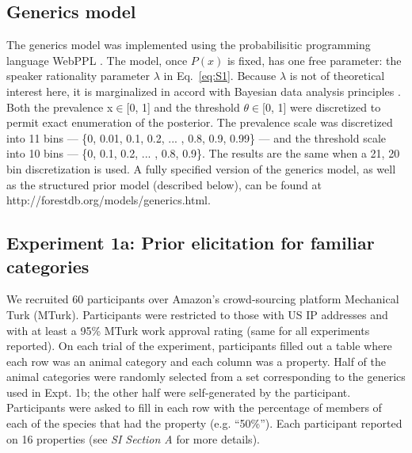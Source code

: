 \documentclass{pnastwo}
\begin{document}
\begin{article}
\begin{materials}
\subsection{Generics model}
The generics model was implemented using the probabilisitic programming language WebPPL \cite{dippl}. 
The model, once $P(x)$ is fixed, has one free parameter: the speaker rationality parameter $\lambda$ in Eq.~\ref{eq:S1}. 
Because $\lambda$ is not of theoretical interest here, it is marginalized in accord with Bayesian data analysis principles \cite{LW2014}.
Both the prevalence  x$\in$[0, 1]  and the threshold  $\theta \in$[0, 1] were discretized to permit exact enumeration of the posterior.
The prevalence scale was discretized into 11 bins --- \{0, 0.01, 0.1, 0.2, ... , 0.8, 0.9, 0.99\} --- and the threshold scale into 10 bins ---  \{0, 0.1, 0.2, ... , 0.8, 0.9\}. 
The results are the same when a 21, 20 bin discretization is used. 
A fully specified version of the generics model, as well as the structured prior model (described below), can be found at http://forestdb.org/models/generics.html. 

\subsection{Experiment 1a: Prior elicitation for familiar categories}
We recruited 60 participants over Amazon's crowd-sourcing platform Mechanical Turk (MTurk).  
Participants were restricted to those with US IP addresses and with at least a 95\% MTurk work approval rating (same for all experiments reported). 
On each trial of the experiment, participants filled out a table where each row was an animal category and each column was a property. 
Half of the animal categories were randomly selected from a set corresponding to the generics used in Expt. 1b; the other half were self-generated by the participant.
Participants were asked to fill in each row with the percentage of members of each of the species that had the property (e.g. ``50\%'').
Each participant reported on 16 properties (see {\it SI Section A} for more details).


\end{materials}
\end{article}
\end{document}
